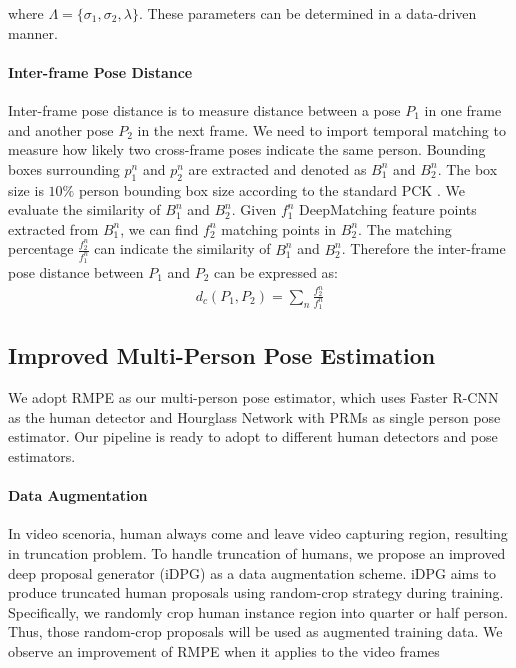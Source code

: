 \documentclass{bmvc2k}
\begin{document}
where $\Lambda=\{\sigma_1,\sigma_2,\lambda\}$. These parameters can be determined in a data-driven manner.
\vspace{-3mm}
\paragraph{Inter-frame Pose Distance}
Inter-frame pose distance is to measure distance between a pose $P_1$ in one frame and another pose $P_2$ in the next frame. We need to import temporal matching to measure how likely two cross-frame poses indicate the same person. Bounding boxes surrounding $p_1^n$ and $p_2^n$ are extracted and denoted as $B_1^n$ and $B_2^n$. The box size is $10\%$ person bounding box size according to the standard PCK \cite{andriluka14cvpr}. We evaluate the similarity of $B_1^n$ and $B_2^n$. Given $f_1^n$ DeepMatching feature \cite{revaud2016deepmatching} points extracted from $B_1^n$, we can find $f_2^n$ matching points in $B_2^n$. The matching percentage $\frac{f_2^n}{f_1^n}$ can indicate the similarity of $B_1^n$ and $B_2^n$. Therefore the inter-frame pose distance between $P_1$ and $P_2$ can be expressed as:
\begin{equation}
\begin{aligned}
 d_c(P_1,P_2) =  \sum_{n} \frac{f_2^n}{f_1^n}
\end{aligned}
\end{equation}

\subsection{Improved Multi-Person Pose Estimation}
We adopt RMPE \cite{fang2017rmpe} as our multi-person pose estimator, which uses Faster R-CNN\cite{ren2015faster} as the human detector and Hourglass Network with PRMs \cite{yang2017learning} as single person pose estimator. Our pipeline is ready to adopt to different human detectors and pose estimators.
\vspace{-3mm}
\paragraph{Data Augmentation} 
In video scenoria, human always come and leave video capturing region, resulting in truncation problem. To handle truncation of humans, we propose an improved deep proposal generator (iDPG) as a data augmentation scheme. iDPG aims to produce truncated human proposals using random-crop strategy during training. Specifically, we randomly crop human instance region into quarter or half person. Thus, those random-crop proposals will be used as augmented training data. We observe an improvement of RMPE when it applies to the video frames 
\vspace{-4mm}
\end{document}
